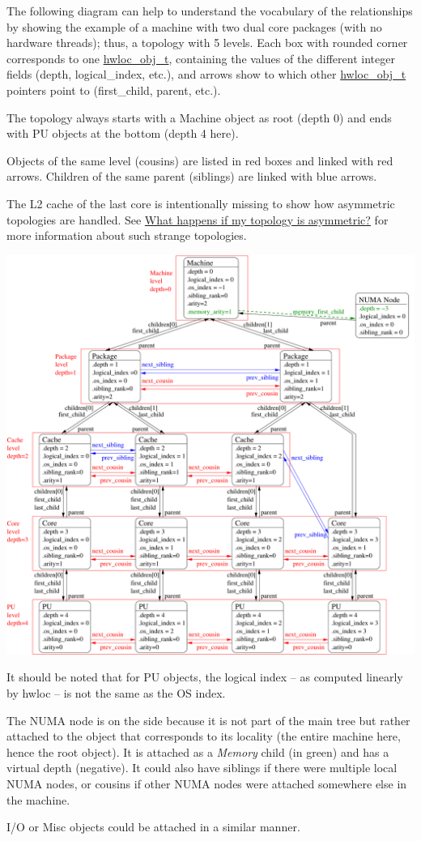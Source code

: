The following diagram can help to understand the vocabulary of the relationships by showing the example of a machine with two dual core packages (with no hardware threads); thus, a topology with 5 levels. Each box with rounded corner corresponds to one \hyperlink{a00185_ga79b8ab56877ef99ac59b833203391c7d}{hwloc\+\_\+obj\+\_\+t}, containing the values of the different integer fields (depth, logical\+\_\+index, etc.), and arrows show to which other \hyperlink{a00185_ga79b8ab56877ef99ac59b833203391c7d}{hwloc\+\_\+obj\+\_\+t} pointers point to (first\+\_\+child, parent, etc.).

The topology always starts with a Machine object as root (depth 0) and ends with PU objects at the bottom (depth 4 here).

Objects of the same level (cousins) are listed in red boxes and linked with red arrows. Children of the same parent (siblings) are linked with blue arrows.

The L2 cache of the last core is intentionally missing to show how asymmetric topologies are handled. See \hyperlink{a00394_faq_asymmetric}{What happens if my topology is asymmetric?} for more information about such strange topologies.

 
\begin{DoxyImageNoCaption}
  \mbox{\includegraphics[width=\textwidth]{diagram}}
\end{DoxyImageNoCaption}


It should be noted that for PU objects, the logical index -- as computed linearly by hwloc -- is not the same as the OS index.

The N\+U\+MA node is on the side because it is not part of the main tree but rather attached to the object that corresponds to its locality (the entire machine here, hence the root object). It is attached as a {\itshape Memory} child (in green) and has a virtual depth (negative). It could also have siblings if there were multiple local N\+U\+MA nodes, or cousins if other N\+U\+MA nodes were attached somewhere else in the machine.

I/O or Misc objects could be attached in a similar manner. 